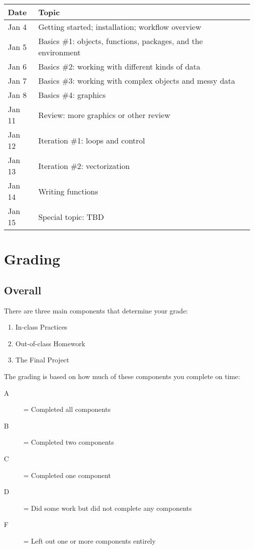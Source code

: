 \documentclass{tufte-handout}
\begin{document}
\begin{center}
\begin{tabular}{ll}
 Date    &  Topic                                                          \\
\hline
 Jan 4   &  Getting started; installation; workflow overview               \\
 Jan 5   &  Basics \#1: objects, functions, packages, and the environment  \\
 Jan 6   &  Basics \#2: working with different kinds of data               \\
 Jan 7   &  Basics \#3: working with complex objects and messy data        \\
 Jan 8   &  Basics \#4: graphics                                           \\
 Jan 11  &  Review: more graphics or other review                          \\
 Jan 12  &  Iteration \#1: loops and control                               \\
 Jan 13  &  Iteration \#2: vectorization                                   \\
 Jan 14  &  Writing functions                                              \\
 Jan 15  &  Special topic: TBD                                             \\
\end{tabular}
\end{center}
\section*{Grading}
\label{sec-6}
\subsection*{Overall}
\label{sec-6-1}

There are three main components that determine your grade:
\begin{enumerate}
\item In-class Practices
\item Out-of-class Homework
\item The Final Project
\end{enumerate}

The grading is based on how much of these components you complete on time:
\begin{description}
\item[A] = Completed all components
\item[B] = Completed two components
\item[C] = Completed one component
\item[D] = Did some work but did not complete any components
\item[F] = Left out one or more components entirely
\end{description}
\end{document}
